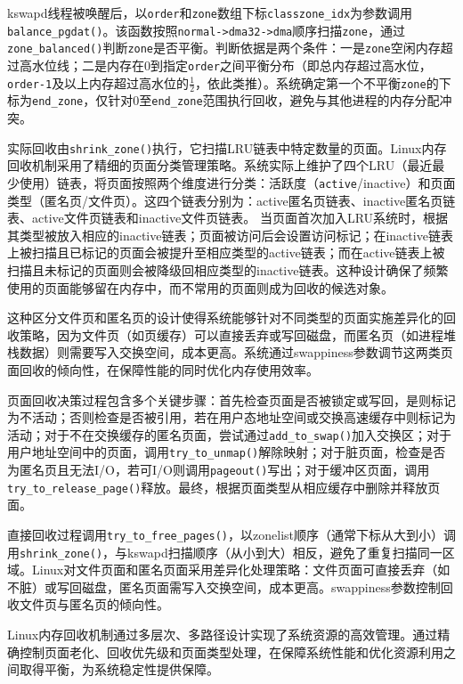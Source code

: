 kswapd线程被唤醒后，以\texttt{order}和\texttt{zone}数组下标\texttt{classzone\_idx}为参数调用\texttt{balance\_pgdat()}。该函数按照\texttt{normal->dma32->dma}顺序扫描\texttt{zone}，通过\texttt{zone\_balanced()}判断\texttt{zone}是否平衡。判断依据是两个条件：一是\texttt{zone}空闲内存超过高水位线；二是内存在0到指定\texttt{order}之间平衡分布（即总内存超过高水位，\texttt{order-1}及以上内存超过高水位的\(\frac{1}{2}\)，依此类推）。系统确定第一个不平衡\texttt{zone}的下标为\texttt{end\_zone}，仅针对0至\texttt{end\_zone}范围执行回收，避免与其他进程的内存分配冲突。

实际回收由\texttt{shrink\_zone()}执行，它扫描LRU链表中特定数量的页面。Linux内存回收机制采用了精细的页面分类管理策略。系统实际上维护了四个LRU（最近最少使用）链表，将页面按照两个维度进行分类：活跃度（\texttt{active}/inactive）和页面类型（匿名页/文件页）。这四个链表分别为：active匿名页链表、inactive匿名页链表、active文件页链表和inactive文件页链表。
当页面首次加入LRU系统时，根据其类型被放入相应的inactive链表；页面被访问后会设置访问标记；在inactive链表上被扫描且已标记的页面会被提升至相应类型的active链表；而在active链表上被扫描且未标记的页面则会被降级回相应类型的inactive链表。这种设计确保了频繁使用的页面能够留在内存中，而不常用的页面则成为回收的候选对象。

这种区分文件页和匿名页的设计使得系统能够针对不同类型的页面实施差异化的回收策略，因为文件页（如页缓存）可以直接丢弃或写回磁盘，而匿名页（如进程堆栈数据）则需要写入交换空间，成本更高。系统通过swappiness参数调节这两类页面回收的倾向性，在保障性能的同时优化内存使用效率。

页面回收决策过程包含多个关键步骤：首先检查页面是否被锁定或写回，是则标记为不活动；否则检查是否被引用，若在用户态地址空间或交换高速缓存中则标记为活动；对于不在交换缓存的匿名页面，尝试通过\texttt{add\_to\_swap()}加入交换区；对于用户地址空间中的页面，调用\texttt{try\_to\_unmap()}解除映射；对于脏页面，检查是否为匿名页且无法I/O，若可I/O则调用\texttt{pageout()}写出；对于缓冲区页面，调用\texttt{try\_to\_release\_page()}释放。最终，根据页面类型从相应缓存中删除并释放页面。

直接回收过程调用\texttt{try\_to\_free\_pages()}，以zonelist顺序（通常下标从大到小）调用\texttt{shrink\_zone()}，与kswapd扫描顺序（从小到大）相反，避免了重复扫描同一区域。Linux对文件页面和匿名页面采用差异化处理策略：文件页面可直接丢弃（如不脏）或写回磁盘，匿名页面需写入交换空间，成本更高。swappiness参数控制回收文件页与匿名页的倾向性。

Linux内存回收机制通过多层次、多路径设计实现了系统资源的高效管理。通过精确控制页面老化、回收优先级和页面类型处理，在保障系统性能和优化资源利用之间取得平衡，为系统稳定性提供保障。

